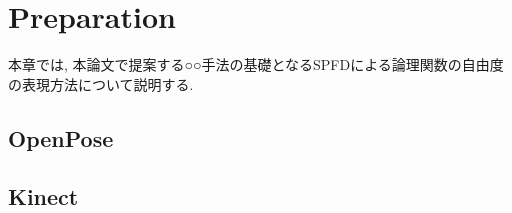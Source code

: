 \chapter{Preparation}
本章では, 本論文で提案する○○手法の基礎となるSPFDによる論理関数の自由度の表現方法について説明する.
\section{OpenPose}
\section{Kinect}
